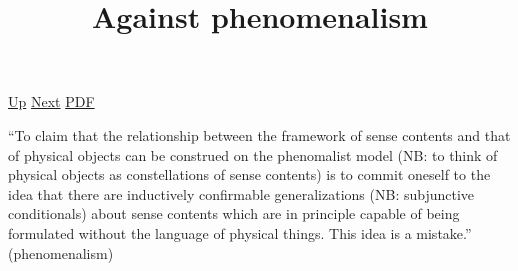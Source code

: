 \documentclass[12pt,a4paper]{report}
\begin{document}
 \href{doc/phil/People/Sellars/Quotes.html}{Up} 
 \href{doc/phil/People/Sellars/Quotes/Community.html}{Next} 
 \href{doc/phil/People/Sellars/Quotes/Againstphenomenalism.pdf}{PDF} 
\title{Against phenomenalism}
``To claim that the relationship between the framework of sense contents and
that of physical objects can be construed on the phenomalist model (NB: to
think of physical objects as constellations of sense contents) is to commit
oneself to the idea that there are inductively confirmable generalizations (NB:
 subjunctive conditionals) about sense contents which are in principle capable
 of being formulated without the language of physical things. This idea is a
 mistake.'' (phenomenalism)
\end{document}
